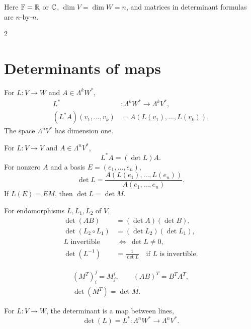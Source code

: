 \begin{fullwidth}
  Here \(\mathbb F=\mathbb{R}\) or \(\mathbb{C}\), \(\dim V=\dim W=n\), and matrices
  in determinant formulas are \(n\)-by-\(n\).

  \begin{multicols}{2}
    \raggedcolumns
    \section{Determinants of maps}
    \label{sec:appendix:formula-sheet-determinants-of-maps}

    For \(L:V\to W\) and \(A\in\Lambda^k W^*\),
    \[
      \begin{aligned}
        L^*&:\Lambda^k W^*\to\Lambda^k V^*,\\
        (L^*A)(v_1,\ldots,v_k)&=A(L(v_1),\ldots,L(v_k)).
      \end{aligned}
    \]
    The space \(\Lambda^n V^*\) has dimension one.

    For \(L:V\to V\) and \(A\in\Lambda^n V^*\),
    \[
      L^*A=(\det L)A.
    \]
    For nonzero \(A\) and a basis \(E=(e_1,\ldots,e_n)\),
    \[
      \det L=\frac{A(L(e_1),\ldots,L(e_n))}{A(e_1,\ldots,e_n)}.
    \]
    If \(L(E)=EM\), then \(\det L=\det M\).

    For endomorphisms \(L,L_1,L_2\) of \(V\),
    \[
      \begin{aligned}
        \det(AB)&=(\det A)(\det B),\\
        \det(L_2\circ L_1)&=(\det L_2)(\det L_1),\\
        L\text{ invertible}&\ \Longleftrightarrow\ \det L\ne0,\\
        \det(L^{-1})&=\frac1{\det L}\quad\text{if \(L\) is invertible}.
      \end{aligned}
    \]

    \[
      \begin{gathered}
        (M^T)^j_i=M^i_j,\qquad (AB)^T=B^TA^T,\\
        \det(M^T)=\det M.
      \end{gathered}
    \]

    For \(L:V\to W\), the determinant is a map between lines,
    \[
      \det(L)=L^*:\Lambda^n W^*\to\Lambda^n V^*.
    \]


\end{multicols}
\end{fullwidth}
